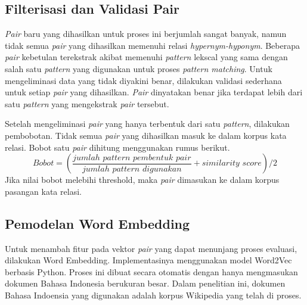\subsection{Filterisasi dan Validasi Pair}
\textit{Pair} baru yang dihasilkan untuk proses ini berjumlah sangat banyak, namun tidak semua \textit{pair} yang dihasilkan memenuhi relasi \textit{hypernym-hyponym}. Beberapa \textit{pair} kebetulan terekstrak akibat memenuhi \textit{pattern} lekscal yang sama dengan salah satu \textit{pattern} yang digunakan untuk proses \textit{pattern matching}. Untuk mengeliminasi data yang tidak diyakini benar, dilakukan validasi sederhana untuk setiap \textit{pair} yang dihasilkan. \textit{Pair} dinyatakan benar jika terdapat lebih dari satu \textit{pattern} yang mengekstrak \textit{pair} tersebut.

Setelah mengeliminasi \textit{pair} yang hanya terbentuk dari satu \textit{pattern}, dilakukan pembobotan. Tidak semua \textit{pair} yang dihasilkan masuk ke dalam korpus kata relasi. Bobot satu \textit{pair} dihitung menggunakan rumus berikut. 
\[ Bobot = (\frac{jumlah\,\,pattern\,\,pembentuk\,\,pair}{jumlah\,\,pattern\,\,digunakan} + similarity\,\,score)/2 \]
\noindent Jika nilai bobot melebihi threshold, maka \textit{pair} dimasukan ke dalam korpus pasangan kata relasi.



\subsection{Pemodelan Word Embedding}
Untuk menambah fitur pada vektor \textit{pair} yang dapat menunjang proses evaluasi, dilakukan Word Embedding. Implementasinya menggunakan model Word2Vec berbasis Python. Proses ini dibuat secara otomatis dengan hanya mengmasukan dokumen Bahasa Indonesia berukuran besar. Dalam penelitian ini, dokumen Bahasa Indoensia yang digunakan adalah korpus Wikipedia yang telah di proses.

